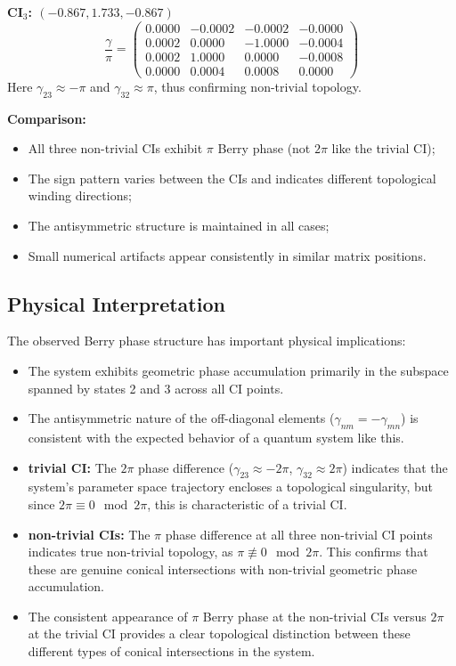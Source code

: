 \documentclass{article}
\begin{document}
\textbf{CI$_3$: $(-0.867, 1.733, -0.867)$}
\begin{equation}
\frac{\gamma}{\pi} = 
\begin{pmatrix}
 0.0000 & -0.0002 & -0.0002 & -0.0000 \\
 0.0002 &  0.0000 & -1.0000 & -0.0004 \\
 0.0002 &  1.0000 &  0.0000 & -0.0008 \\
 0.0000 &  0.0004 &  0.0008 &  0.0000
\end{pmatrix}
\end{equation}
Here $\gamma_{23} \approx -\pi$ and $\gamma_{32} \approx \pi$, thus confirming non-trivial topology.

\textbf{Comparison:}
\begin{itemize}
    \item All three non-trivial CIs exhibit $\pi$ Berry phase (not $2\pi$ like the trivial CI);
    \item The sign pattern varies between the CIs and indicates different topological winding directions;
    \item The antisymmetric structure is maintained in all cases;
    \item Small numerical artifacts appear consistently in similar matrix positions.
\end{itemize}

\subsection{Physical Interpretation}

The observed Berry phase structure has important physical implications:

\begin{itemize}
    \item The system exhibits geometric phase accumulation primarily in the subspace spanned by states 2 and 3 across all CI points.
    
    \item The antisymmetric nature of the off-diagonal elements ($\gamma_{nm} = -\gamma_{mn}$) is consistent with the expected behavior of a quantum system like this.
    
    \item \textbf{trivial CI:} The $2\pi$ phase difference ($\gamma_{23} \approx -2\pi$, $\gamma_{32} \approx 2\pi$) indicates that the system's parameter space trajectory encloses a topological singularity, but since $2\pi \equiv 0 \mod 2\pi$, this is characteristic of a trivial CI.
    
    \item \textbf{non-trivial CIs:} The $\pi$ phase difference at all three non-trivial CI points indicates true non-trivial topology, as $\pi \not\equiv 0 \mod 2\pi$. This confirms that these are genuine conical intersections with non-trivial geometric phase accumulation.
    
    \item The consistent appearance of $\pi$ Berry phase at the non-trivial CIs versus $2\pi$ at the trivial CI provides a clear topological distinction between these different types of conical intersections in the system.

\end{itemize}
\end{document}
